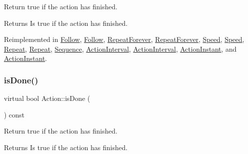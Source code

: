 Return true if the action has finished.

\begin{DoxyReturn}{Returns}
Is true if the action has finished. 
\end{DoxyReturn}


Reimplemented in \hyperlink{classFollow_a643d457b3bd235733eb9ae63ef5ebc1f}{Follow}, \hyperlink{classFollow_a7b551b92d3313e4fe3aadbed45283911}{Follow}, \hyperlink{classRepeatForever_a5bae9a12b19d0c39d2a8a416bc68b1db}{Repeat\+Forever}, \hyperlink{classRepeatForever_a373f8961c015a1afa61c293ce787382c}{Repeat\+Forever}, \hyperlink{classSpeed_a6897f29e4fc1c8515fc12f9e98ebebef}{Speed}, \hyperlink{classSpeed_a6c357c4da932b6793c4626975546cb28}{Speed}, \hyperlink{classRepeat_a2efd4a590fb52dbc862b1e086509b87a}{Repeat}, \hyperlink{classRepeat_a01f8323eda5c46d6f103e8f8c5027f30}{Repeat}, \hyperlink{classSequence_a2f331fff9e2ab6e63569f55615a1c03e}{Sequence}, \hyperlink{classActionInterval_a2a62feefec443d8a99c644fd5f3a5d7e}{Action\+Interval}, \hyperlink{classActionInterval_a466ff6a3a5f95e47d4d01bfa4775290d}{Action\+Interval}, \hyperlink{classActionInstant_a9d54eff7c6e29764843fbbb965643643}{Action\+Instant}, and \hyperlink{classActionInstant_a3979d0556340173cdf58111665a96afd}{Action\+Instant}.

\mbox{\label{classAction_af8a1b5aea4383d37df6e2a53dad6799b}} 
\subsubsection{\texorpdfstring{is\+Done()}{isDone()}\hspace{0.1cm}{\footnotesize\ttfamily [2/2]}}
{\footnotesize\ttfamily virtual bool Action\+::is\+Done (\begin{DoxyParamCaption}{ }\end{DoxyParamCaption}) const\hspace{0.3cm}{\ttfamily [virtual]}}

Return true if the action has finished.

\begin{DoxyReturn}{Returns}
Is true if the action has finished. 
\end{DoxyReturn}


